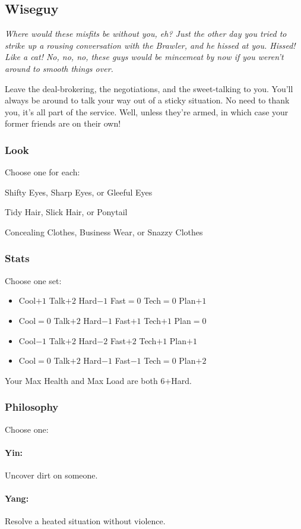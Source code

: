 \subsection{Wiseguy}
{\itshape Where would these misfits be without you, eh? Just the other
  day you tried to strike up a rousing conversation with the Brawler,
  and he \emph{hissed} at you. Hissed! Like a cat! No, no, no, these
  guys would be mincemeat by now if you weren't around to smooth
  things over.

Leave the deal-brokering, the negotiations, and the sweet-talking to
you. You'll always be around to talk your way out of a sticky
situation. No need to thank you, it's all part of the service. Well,
unless they're armed, in which case your former friends are on their
own!}
\subsubsection{Look}
Choose one for each:

Shifty Eyes, Sharp Eyes, or Gleeful Eyes

Tidy Hair, Slick Hair, or Ponytail

Concealing Clothes, Business Wear, or Snazzy Clothes

\subsubsection{Stats}
Choose one set:
\begin{itemize}
\setlength\itemsep{0em}
\item Cool$+1$ Talk$+2$ Hard$-1$ Fast${=}0$ Tech${=}0$ Plan$+1$
\item Cool${=}0$ Talk$+2$ Hard$-1$ Fast$+1$ Tech$+1$ Plan${=}0$
\item Cool$-1$ Talk$+2$ Hard$-2$ Fast$+2$ Tech$+1$ Plan$+1$
\item Cool${=}0$ Talk$+2$ Hard$-1$ Fast$-1$ Tech${=}0$ Plan$+2$
\end{itemize}

Your Max Health and Max Load are both 6+Hard.

\subsubsection{Philosophy}
Choose one:
\paragraph{Yin:} Uncover dirt on someone.
\paragraph{Yang:} Resolve a heated situation without violence.

